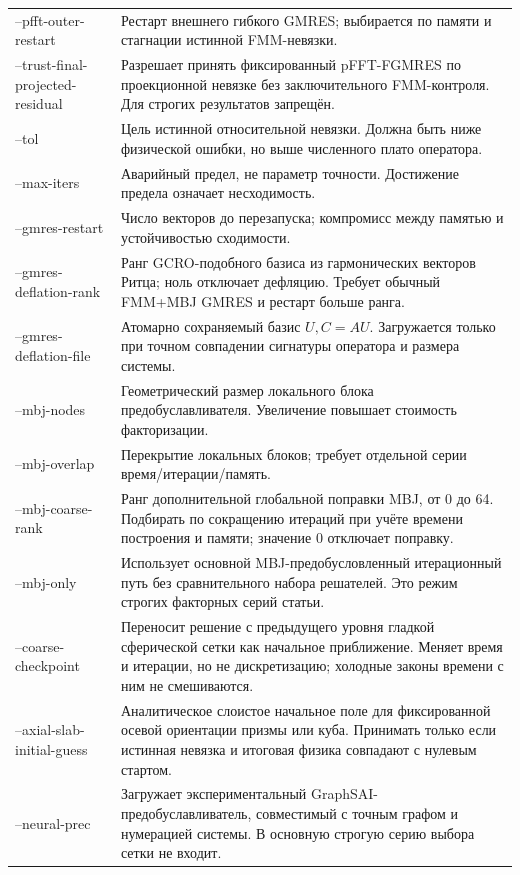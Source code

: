 \documentclass[12pt,a4paper]{article}
\begin{document}
\begin{longtable}{>{\ttfamily\raggedright\arraybackslash}p{}p{}}
--pfft-outer-restart & Рестарт внешнего гибкого GMRES; выбирается по памяти и стагнации истинной FMM-невязки.\\
--trust-final-\allowbreak projected-\allowbreak residual & Разрешает принять фиксированный pFFT-FGMRES по проекционной невязке без заключительного FMM-контроля. Для строгих результатов запрещён.\\
--tol & Цель истинной относительной невязки. Должна быть ниже физической ошибки, но выше численного плато оператора.\\
--max-iters & Аварийный предел, не параметр точности. Достижение предела означает несходимость.\\
--gmres-restart & Число векторов до перезапуска; компромисс между памятью и устойчивостью сходимости.\\
--gmres-\allowbreak deflation-\allowbreak rank & Ранг GCRO-подобного базиса из гармонических векторов Ритца; ноль отключает дефляцию. Требует обычный FMM+MBJ GMRES и рестарт больше ранга.\\
--gmres-\allowbreak deflation-\allowbreak file & Атомарно сохраняемый базис $U,C=AU$. Загружается только при точном совпадении сигнатуры оператора и размера системы.\\
--mbj-nodes & Геометрический размер локального блока предобуславливателя. Увеличение повышает стоимость факторизации.\\
--mbj-overlap & Перекрытие локальных блоков; требует отдельной серии время/итерации/память.\\
--mbj-coarse-rank & Ранг дополнительной глобальной поправки MBJ, от 0 до 64. Подбирать по сокращению итераций при учёте времени построения и памяти; значение 0 отключает поправку.\\
--mbj-only & Использует основной MBJ-предобусловленный итерационный путь без сравнительного набора решателей. Это режим строгих факторных серий статьи.\\
--coarse-checkpoint & Переносит решение с предыдущего уровня гладкой сферической сетки как начальное приближение. Меняет время и итерации, но не дискретизацию; холодные законы времени с ним не смешиваются.\\
--axial-slab-\allowbreak initial-\allowbreak guess & Аналитическое слоистое начальное поле для фиксированной осевой ориентации призмы или куба. Принимать только если истинная невязка и итоговая физика совпадают с нулевым стартом.\\
--neural-prec & Загружает экспериментальный GraphSAI-предобуславливатель, совместимый с точным графом и нумерацией системы. В основную строгую серию выбора сетки не входит.\\

\end{longtable}
\end{document}
